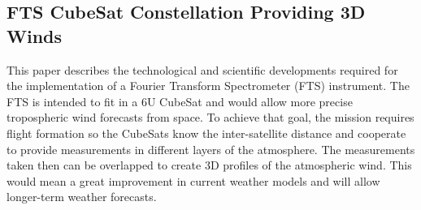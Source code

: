 \subsection{FTS CubeSat Constellation Providing 3D Winds}

This paper describes the technological and scientific developments required for the implementation of a Fourier Transform Spectrometer (FTS) instrument. The FTS is intended to fit in a 6U CubeSat and would allow more precise tropospheric wind forecasts from space. To achieve that goal, the mission requires flight formation so the CubeSats know the inter-satellite distance and cooperate to provide measurements in different layers of the atmosphere. The measurements taken then can be overlapped to create 3D profiles of the atmospheric wind. This would mean a great improvement in current weather models and will allow longer-term weather forecasts. \cite{Wloszek_3Dwinds}